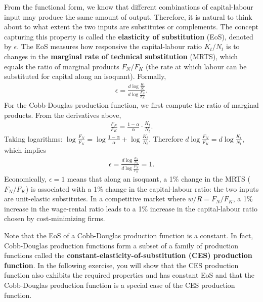 \documentclass{book}
\theoremstyle{definition}
\theoremstyle{plain}
\begin{document}
From the functional form, we know that different combinations of capital-labour input may produce the same amount of output. Therefore, it is natural to think about to what extent the two inputs are substitutes or complements. The concept capturing this property is called the \textbf{elasticity of substitution} (EoS), denoted by $\epsilon$. The EoS measures how responsive the capital-labour ratio $K_t/N_t$ is to changes in the \textbf{marginal rate of technical substitution} (MRTS), which equals the ratio of marginal products $F_N/F_K$ (the rate at which labour can be substituted for capital along an isoquant). Formally,
\begin{align*}
    \epsilon = \frac{d \log \frac{K_t}{N_t}}{d \log \frac{F_N}{F_K}}.
\end{align*}
For the Cobb-Douglas production function, we first compute the ratio of marginal products. From the derivatives above,
\begin{align*}
    \frac{F_N}{F_K} = \frac{1-\alpha}{\alpha} \cdot \frac{K_t}{N_t}.
\end{align*}
Taking logarithms: $\log \frac{F_N}{F_K} = \log \frac{1-\alpha}{\alpha} + \log \frac{K_t}{N_t}$. Therefore $d\log \frac{F_N}{F_K} = d\log \frac{K_t}{N_t}$, which implies
\begin{align*}
    \epsilon = \frac{d \log \frac{K_t}{N_t}}{d \log \frac{F_N}{F_K}} = 1.
\end{align*}
Economically, $\epsilon = 1$ means that along an isoquant, a 1\% change in the MRTS ($F_N/F_K$) is associated with a 1\% change in the capital-labour ratio: the two inputs are unit-elastic substitutes. In a competitive market where $w/R = F_N/F_K$, a 1\% increase in the wage-rental ratio leads to a 1\% increase in the capital-labour ratio chosen by cost-minimizing firms.

Note that the EoS of a Cobb-Douglas production function is a constant. In fact, Cobb-Douglas production functions form a subset of a family of production functions called the \textbf{constant-elasticity-of-substitution (CES) production function}. In the following exercise, you will show that the CES production function also exhibits the required properties and has constant EoS and that the Cobb-Douglas production function is a special case of the CES production function.
\end{document}
